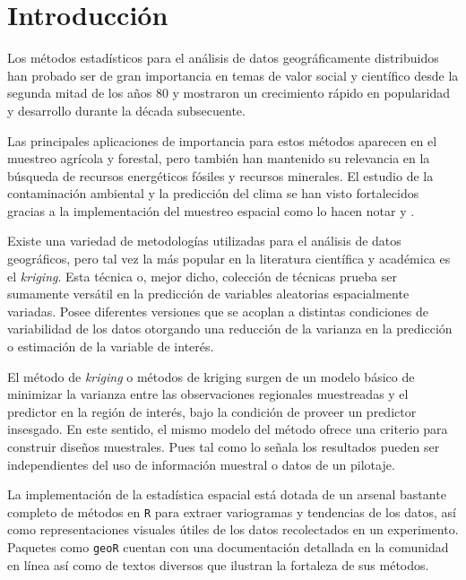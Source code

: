\documentclass[14pt]{extarticle}
\begin{document}
\newpage
\section*{Introducción}

Los métodos estadísticos para el análisis de datos geográficamente distribuidos han probado ser de gran importancia en temas de valor social y científico desde la segunda mitad de los años 80 y mostraron un crecimiento rápido en popularidad y desarrollo durante la década subsecuente. 

Las principales aplicaciones de importancia para estos métodos aparecen en el muestreo agrícola y forestal, pero también han mantenido su relevancia en la búsqueda de recursos energéticos fósiles y recursos minerales. El estudio de la contaminación ambiental y la predicción del clima se han visto fortalecidos gracias a la implementación del muestreo espacial como lo hacen notar \cite{Alinghaus.1996} y \cite{Hohn.1993}. 

Existe una variedad de metodologías utilizadas para el análisis de datos geográficos, pero tal vez la más popular en la literatura científica y académica es el \textit{kriging}. Esta técnica o, mejor dicho, colección de técnicas prueba ser sumamente versátil en la predicción de variables aleatorias espacialmente variadas. Posee diferentes versiones que se acoplan a distintas condiciones de variabilidad de los datos otorgando una reducción de la varianza en la predicción o estimación de la variable de interés. 

El método de \textit{kriging} o métodos de kriging surgen de un modelo básico de minimizar la varianza entre las observaciones regionales muestreadas y el predictor en la región de interés, bajo la condición de proveer un predictor insesgado. En este sentido, el mismo modelo del método ofrece una criterio para construir diseños muestrales. Pues tal como lo señala \cite{Cressie.1986} los resultados pueden ser independientes del uso de información muestral o datos de un pilotaje. 

La implementación de la estadística espacial está dotada de un arsenal bastante completo de métodos en \verb|R| para extraer variogramas y tendencias de los datos, así como representaciones visuales útiles de los datos recolectados en un experimento. Paquetes como \verb|geoR| cuentan con una documentación detallada en la comunidad en línea así como de textos diversos que ilustran la fortaleza de sus métodos. 
\end{document}
